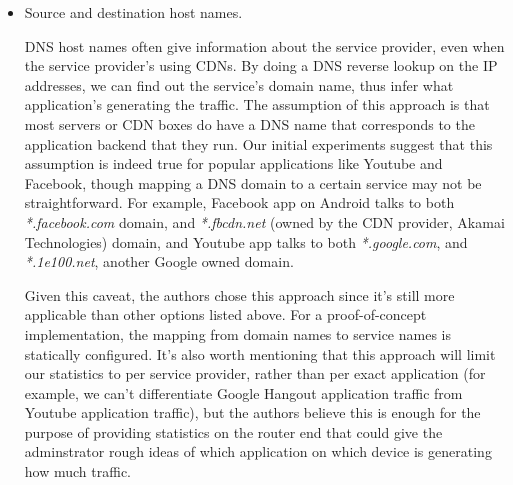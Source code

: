 \begin{itemize}
\begin{itemize}
  \item Source and destination host names. 

  DNS host names often give information about the service provider, even when the service provider's using CDNs. By doing a DNS reverse lookup on the IP addresses, we can find out the service's domain name, thus infer what application's generating the traffic. The assumption of this approach is that most servers or CDN boxes do have a DNS name that corresponds to the application backend that they run. Our initial experiments suggest that this assumption is indeed true for popular applications like Youtube and Facebook, though mapping a DNS domain to a certain service may not be straightforward. For example, Facebook app on Android talks to both \textit{*.facebook.com} domain, and \textit{*.fbcdn.net} (owned by the CDN provider, Akamai Technologies) domain, and Youtube app talks to both \textit{*.google.com}, and \textit{*.1e100.net}, another Google owned domain. 

  Given this caveat, the authors chose this approach since it's still more applicable than other options listed above. For a proof-of-concept implementation, the mapping from domain names to service names is statically configured. It's also worth mentioning that this approach will limit our statistics to per service provider, rather than per exact application (for example, we can't differentiate Google Hangout application traffic from Youtube application traffic), but the authors believe this is enough for the purpose of providing statistics on the router end that could give the adminstrator rough ideas of which application on which device is generating how much traffic.

  \end{itemize} 

\end{itemize}

